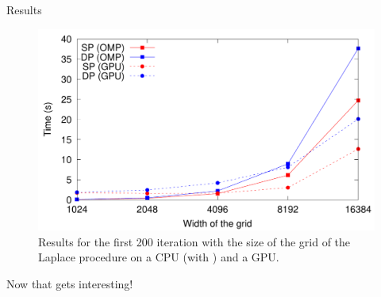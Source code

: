\begin{frame}{Results}
	\begin{figure}
		\centering
		\includegraphics[width=.85\textwidth]{im/result_GPU_Laplace}
		\caption{Results for the first 200 iteration with the size of the grid of the Laplace procedure on a CPU (with ) and a GPU.}
	\end{figure}
	Now that gets interesting! 
\end{frame}
